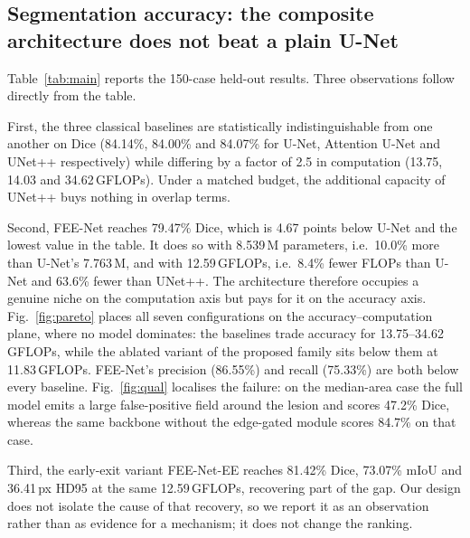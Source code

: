\documentclass[journal]{IEEEtran}
\begin{document}
\subsection{Segmentation accuracy: the composite architecture does not beat a plain U-Net}

Table~\ref{tab:main} reports the 150-case held-out results. Three observations follow directly from the table.

First, the three classical baselines are statistically indistinguishable from one another on Dice (84.14\%, 84.00\% and 84.07\% for U-Net, Attention U-Net and UNet++ respectively) while differing by a factor of 2.5 in computation (13.75, 14.03 and 34.62\,GFLOPs). Under a matched budget, the additional capacity of UNet++ buys nothing in overlap terms.

Second, FEE-Net reaches 79.47\% Dice, which is 4.67 points below U-Net and the lowest value in the table. It does so with 8.539\,M parameters, i.e.\ 10.0\% more than U-Net's 7.763\,M, and with 12.59\,GFLOPs, i.e.\ 8.4\% fewer FLOPs than U-Net and 63.6\% fewer than UNet++. The architecture therefore occupies a genuine niche on the computation axis but pays for it on the accuracy axis. Fig.~\ref{fig:pareto} places all seven configurations on the accuracy--computation plane, where no model dominates: the baselines trade accuracy for 13.75--34.62\,GFLOPs, while the ablated variant of the proposed family sits below them at 11.83\,GFLOPs. FEE-Net's precision (86.55\%) and recall (75.33\%) are both below every baseline. Fig.~\ref{fig:qual} localises the failure: on the median-area case the full model emits a large false-positive field around the lesion and scores 47.2\% Dice, whereas the same backbone without the edge-gated module scores 84.7\% on that case.

Third, the early-exit variant FEE-Net-EE reaches 81.42\% Dice, 73.07\% mIoU and 36.41\,px HD95 at the same 12.59\,GFLOPs, recovering part of the gap. Our design does not isolate the cause of that recovery, so we report it as an observation rather than as evidence for a mechanism; it does not change the ranking.
\end{document}

